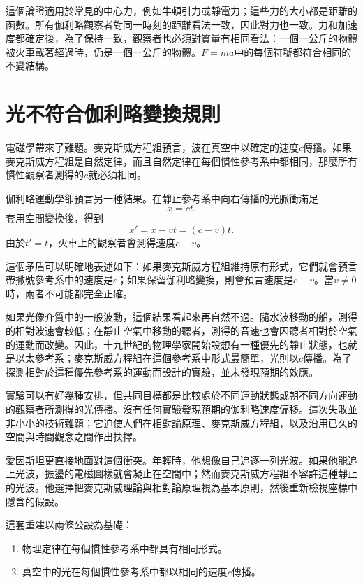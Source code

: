 這個論證適用於常見的中心力，例如牛頓引力或靜電力；這些力的大小都是距離的函數。所有伽利略觀察者對同一時刻的距離看法一致，因此對力也一致。力和加速度都確定後，為了保持一致，觀察者也必須對質量有相同看法：一個一公斤的物體被火車載著經過時，仍是一個一公斤的物體。\(F=ma\)中的每個符號都符合相同的不變結構。

\section{光不符合伽利略變換規則}

電磁學帶來了難題。麥克斯威方程組預言，波在真空中以確定的速度\(c\)傳播。如果麥克斯威方程組是自然定律，而且自然定律在每個慣性參考系中都相同，那麼所有慣性觀察者測得的\(c\)就必須相同。

伽利略運動學卻預言另一種結果。在靜止參考系中向右傳播的光脈衝滿足
\begin{equation}
x=ct.
\end{equation}
套用空間變換後，得到
\begin{equation}
x'=x-vt=(c-v)t.
\end{equation}
由於\(t'=t\)，火車上的觀察者會測得速度\(c-v\)。

這個矛盾可以明確地表述如下：如果麥克斯威方程組維持原有形式，它們就會預言帶撇號參考系中的速度是\(c\)；如果保留伽利略變換，則會預言速度是\(c-v\)。當\(v\ne0\)時，兩者不可能都完全正確。

如果光像介質中的一般波動，這個結果看起來再自然不過。隨水波移動的船，測得的相對波速會較低；在靜止空氣中移動的聽者，測得的音速也會因聽者相對於空氣的運動而改變。因此，十九世紀的物理學家開始設想有一種優先的靜止狀態，也就是以太參考系；麥克斯威方程組在這個參考系中形式最簡單，光則以\(c\)傳播。為了探測相對於這種優先參考系的運動而設計的實驗，並未發現預期的效應。

實驗可以有好幾種安排，但共同目標都是比較處於不同運動狀態或朝不同方向運動的觀察者所測得的光傳播。沒有任何實驗發現預期的伽利略速度偏移。這次失敗並非小小的技術難題；它迫使人們在相對論原理、麥克斯威方程組，以及沿用已久的空間與時間觀念之間作出抉擇。

愛因斯坦更直接地面對這個衝突。年輕時，他想像自己追逐一列光波。如果他能追上光波，振盪的電磁圖樣就會凝止在空間中；然而麥克斯威方程組不容許這種靜止的光波。他選擇把麥克斯威理論與相對論原理視為基本原則，然後重新檢視座標中隱含的假設。

這套重建以兩條公設為基礎：
\begin{enumerate}
\item 物理定律在每個慣性參考系中都具有相同形式。
\item 真空中的光在每個慣性參考系中都以相同的速度\(c\)傳播。
\end{enumerate}

